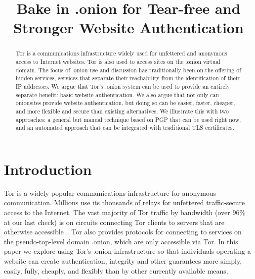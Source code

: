 \documentclass[10pt, conference, compsocconf]{styles/IEEEtran}
\title{Bake in .onion for Tear-free and Stronger Website Authentication}
\author{
\IEEEauthorblockN{Paul Syverson}
\IEEEauthorblockA{U.S. Naval Research Laboratory\\
paul.syverson@nrl.navy.mil}
\and
\IEEEauthorblockN{Griffin Boyce}
\IEEEauthorblockA{Berkman Center for Internet and Society\\
griffin@cryptolab.net}
}
\begin{document}
\maketitle

\begin{abstract}
  Tor is a communications infrastructure widely used for unfettered
  and anonymous access to Internet websites. Tor is also used to
  access sites on the .onion virtual domain.  The focus of .onion use
  and discussion has traditionally been on the offering of hidden
  services, services that separate their reachability from the
  identification of their IP addresses. We argue that Tor's .onion
  system can be used to provide an entirely separate benefit: basic
  website authentication. We also argue that not only can onionsites
  provide website authentication, but doing so can be easier, faster,
  cheaper, and more flexible and secure than existing alternatives.
  We illustrate this with two approaches: a general but manual
  technique based on PGP that can be used right now, and an automated
  approach that can be integrated with traditional TLS certificates.
\end{abstract}

% 
% 
% 
% 
% 
% 
% 
% 
% 
% 
% 

\section{Introduction}
Tor is a widely popular communications infrastructure for anonymous
communication. Millions use its thousands of relays for unfettered
traffic-secure access to the Internet. The vast majority of Tor
traffic by bandwidth (over 96\% at our last check) is on circuits
connecting Tor clients to servers that are otherwise
accessible~\cite{hs-stats-report-2015}. Tor
also provides protocols for connecting to services on the
pseudo-top-level domain .onion, which are only accessible via Tor.
In this paper we explore using Tor's .onion infrastructure so that
individuals operating a website can create authentication, integrity
and other guarantees more simply, easily, fully, cheaply, and flexibly
than by other currently available means.
\end{document}
